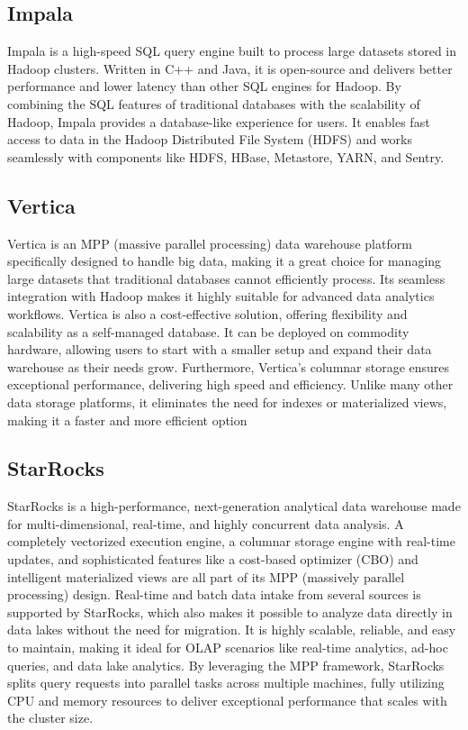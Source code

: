     \subsection{Impala}
    Impala is a high-speed SQL query engine built to process large datasets stored in Hadoop clusters. Written in C++ and Java, it is open-source and delivers better performance and lower latency than other SQL engines for Hadoop. By combining the SQL features of traditional databases with the scalability of Hadoop, Impala provides a database-like experience for users. It enables fast access to data in the Hadoop Distributed File System (HDFS) and works seamlessly with components like HDFS, HBase, Metastore, YARN, and Sentry.
    \cite{Tutorialspoint}
    \subsection{Vertica}
    Vertica is an MPP (massive parallel processing) data warehouse platform specifically designed to handle big data, making it a great choice for managing large datasets that traditional databases cannot efficiently process. Its seamless integration with Hadoop makes it highly suitable for advanced data analytics workflows. Vertica is also a cost-effective solution, offering flexibility and scalability as a self-managed database. It can be deployed on commodity hardware, allowing users to start with a smaller setup and expand their data warehouse as their needs grow. Furthermore, Vertica's columnar storage ensures exceptional performance, delivering high speed and efficiency. Unlike many other data storage platforms, it eliminates the need for indexes or materialized views, making it a faster and more efficient option
    \cite{Tobin}
    \subsection{StarRocks}
    StarRocks is a high-performance, next-generation analytical data warehouse made for multi-dimensional, real-time, and highly concurrent data analysis. A completely vectorized execution engine, a columnar storage engine with real-time updates, and sophisticated features like a cost-based optimizer (CBO) and intelligent materialized views are all part of its MPP (massively parallel processing) design. Real-time and batch data intake from several sources is supported by StarRocks, which also makes it possible to analyze data directly in data lakes without the need for migration.  It is highly scalable, reliable, and easy to maintain, making it ideal for OLAP scenarios like real-time analytics, ad-hoc queries, and data lake analytics. By leveraging the MPP framework, StarRocks splits query requests into parallel tasks across multiple machines, fully utilizing CPU and memory resources to deliver exceptional performance that scales with the cluster size.
    \cite{StarRocks}
